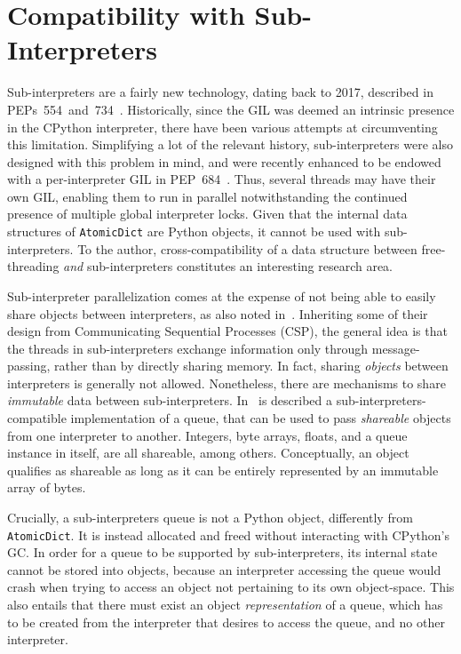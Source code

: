 \section{Compatibility with Sub-Interpreters}\label{sec:compatibility-with-sub-interpreters}

Sub-interpreters are a fairly new technology, dating back to 2017, described in PEPs~554~and~734~\cite{pep554,pep734}.
Historically, since the GIL was deemed an intrinsic presence in the CPython interpreter, there have been various attempts at circumventing this limitation.
Simplifying a lot of the relevant history, sub-interpreters were also designed with this problem in mind, and were recently enhanced to be endowed with a per-interpreter GIL in PEP~684~\cite{pep684}.
Thus, several threads may have their own GIL, enabling them to run in parallel notwithstanding the continued presence of multiple global interpreter locks.
Given that the internal data structures of \texttt{AtomicDict} are Python objects, it cannot be used with sub-interpreters.
To the author, cross-compatibility of a data structure between free-threading \emph{and} sub-interpreters constitutes an interesting research area.

Sub-interpreter parallelization comes at the expense of not being able to easily share objects between interpreters, as also noted in~\cite[{\S}Per-Interpreter GIL]{pep703}.
Inheriting some of their design from Communicating Sequential Processes (CSP), the general idea is that the threads in sub-interpreters exchange information only through message-passing, rather than by directly sharing memory.
In fact, sharing \emph{objects} between interpreters is generally not allowed.
Nonetheless, there are mechanisms to share \emph{immutable} data between sub-interpreters.
In~\cite[\S Queue Objects]{pep734} is described a sub-interpreters-compatible implementation of a queue, that can be used to pass \emph{shareable} objects from one interpreter to another.
Integers, byte arrays, floats, and a queue instance in itself, are all shareable, among others.
Conceptually, an object qualifies as shareable as long as it can be entirely represented by an immutable array of bytes.

Crucially, a sub-interpreters queue is not a Python object, differently from \texttt{AtomicDict}.
It is instead allocated and freed without interacting with CPython's GC\@.
In order for a queue to be supported by sub-interpreters, its internal state cannot be stored into objects, because an interpreter accessing the queue would crash when trying to access an object not pertaining to its own object-space.
This also entails that there must exist an object \emph{representation} of a queue, which has to be created from the interpreter that desires to access the queue, and no other interpreter.

